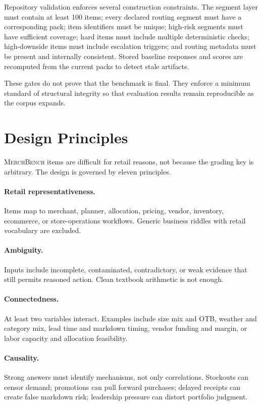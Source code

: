 \documentclass[11pt]{article}
\newcommand{\benchmark}{\textsc{MerchBench}}
\begin{document}
Repository validation enforces several construction constraints. The segment layer must contain at least 100 items; every declared routing segment must have a corresponding pack; item identifiers must be unique; high-risk segments must have sufficient coverage; hard items must include multiple deterministic checks; high-downside items must include escalation triggers; and routing metadata must be present and internally consistent. Stored baseline responses and scores are recomputed from the current packs to detect stale artifacts.

These gates do not prove that the benchmark is final. They enforce a minimum standard of structural integrity so that evaluation results remain reproducible as the corpus expands.

\section{Design Principles}

\benchmark{} items are difficult for retail reasons, not because the grading key is arbitrary. The design is governed by eleven principles.

\paragraph{Retail representativeness.}
Items map to merchant, planner, allocation, pricing, vendor, inventory, ecommerce, or store-operations workflows. Generic business riddles with retail vocabulary are excluded.

\paragraph{Ambiguity.}
Inputs include incomplete, contaminated, contradictory, or weak evidence that still permits reasoned action. Clean textbook arithmetic is not enough.

\paragraph{Connectedness.}
At least two variables interact. Examples include size mix and OTB, weather and category mix, lead time and markdown timing, vendor funding and margin, or labor capacity and allocation feasibility.

\paragraph{Causality.}
Strong answers must identify mechanisms, not only correlations. Stockouts can censor demand; promotions can pull forward purchases; delayed receipts can create false markdown risk; leadership pressure can distort portfolio judgment.
\end{document}
